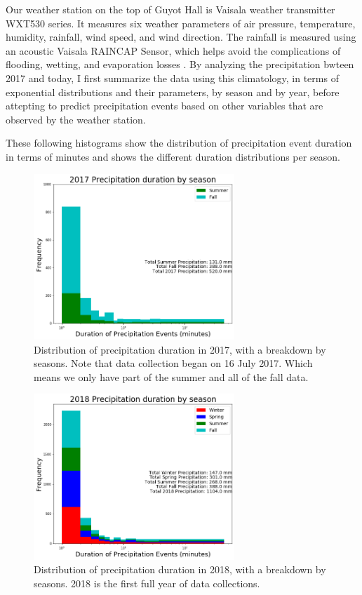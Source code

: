 \documentclass[11pt]{report}
\begin{document}
% 

Our weather station on the top of Guyot Hall is Vaisala weather
transmitter WXT530 series. It measures six weather parameters of air
pressure, temperature, humidity, rainfall, wind speed, and wind
direction. The rainfall is measured using an acoustic Vaisala RAINCAP
Sensor, which helps avoid the complications of flooding, wetting, and
evaporation losses \cite[]{Vaisala}. By analyzing the precipitation
bwteen 2017 and today, I first summarize the data using this
climatology, in terms of exponential distributions and their
parameters, by season and by year, before attepting to predict
precipitation events based on other variables that are observed by the weather station.

These following histograms show the distribution of precipitation event duration in terms of minutes and shows the different duration distributions per season. 

\clearpage
\begin{figure}[t]
	\centering
	\includegraphics[width=0.675\textwidth]{Figures/precip_2017.png}
	\caption[Precipitation histogram for 2017 broken down by
	season]{\label{p2017} Distribution of precipitation duration in
		2017, with a breakdown by seasons. Note that data collection began on 16 July
		2017. Which means we only have part of the summer and all of the fall data. }
\end{figure}
\begin{figure}[b]
	\centering
	\includegraphics[width=0.675\textwidth]{Figures/precip_2018.png}
	\caption[Precipitation histogram for 2018 broken down by season]{\label{p2018}
		Distribution of precipitation duration in 2018, with a breakdown
		by seasons. 2018 is the first full year of data collections.}
\end{figure}
\end{document}
